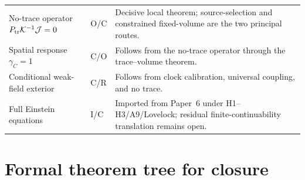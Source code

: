\documentclass[11pt]{article}
\theoremstyle{remark}
\newcommand{\Status}[1]{\textsf{#1}}
\newcommand{\Ptr}{P_{\rm tr}}
\begin{document}
\begin{longtable}{@{}p{}p{}p{}@{}}
No-trace operator $\Ptr\mathcal K^{-1}\mathcal J=0$ & \Status{O/C} & Decisive local theorem; source-selection and constrained fixed-volume are the two principal routes. \\
Spatial response $\gamma_C=1$ & \Status{C/O} & Follows from the no-trace operator through the trace--volume theorem. \\
Conditional weak-field exterior & \Status{C/R} & Follows from clock calibration, universal coupling, and no trace. \\
Full Einstein equations & \Status{I/C} & Imported from Paper~6 under H1--H3/A9/Lovelock; residual finite-continuability translation remains open. \\
\bottomrule
\end{longtable}

\section{Formal theorem tree for closure}
\end{document}
